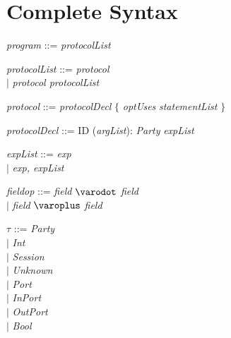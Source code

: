 
\section{Complete Syntax}
\textit{program} ::= \textit{protocolList}\smallskip

\textit{protocolList} ::= \textit{protocol}\\
						\hspace*{5.3em} $ | $ \hspace{0.4em} \textit{protocol protocolList}\smallskip

\textit{protocol} ::= \textit{protocolDecl} $ \{ $ \textit{optUses} \textit{statementList} $\}$\smallskip

\textit{protocolDecl} ::= ID (\textit{argList}): \textit{Party} \textit{expList}\smallskip

\textit{expList} ::= \hspace{1.5em} \textit{exp}\\
					\hspace*{5.3em} $ | $ \hspace{0.4em} \textit{exp, expList}\smallskip

\textit{fieldop} ::= \hspace{1.7em} \textit{field} $\varodot$ \textit{field} \\
					\hspace*{5.3em} $ | $ \hspace{0.4em} \textit{field} $\varoplus$ \textit{field}\smallskip

$\tau$ ::= \hspace{3.8em} \textit{Party} \\
\hspace*{5.3em} $ | $ \hspace{0.4em} \textit{Int} \\
\hspace*{5.3em} $ | $ \hspace{0.4em} \textit{Session} \\
\hspace*{5.3em} $ | $ \hspace{0.4em} \textit{Unknown} \\
\hspace*{5.3em} $ | $ \hspace{0.4em} \textit{Port}\\
\hspace*{5.3em} $ | $ \hspace{0.4em} \textit{InPort}\\
\hspace*{5.3em} $ | $ \hspace{0.4em} \textit{OutPort}\\
\hspace*{5.3em} $ | $ \hspace{0.4em} \textit{Bool}\smallskip

